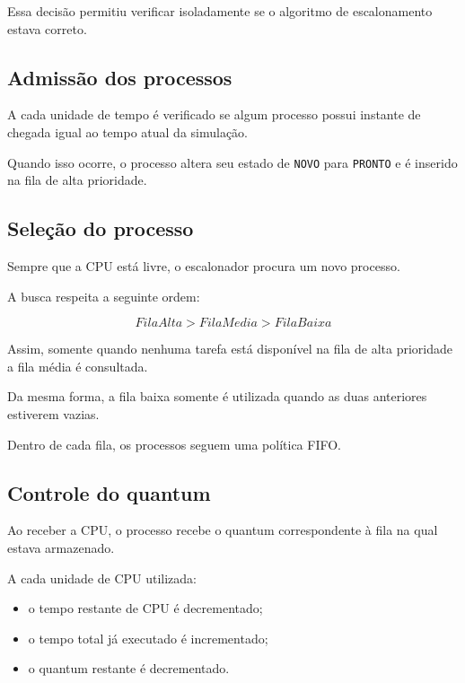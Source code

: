 \documentclass[12pt,a4paper]{article}
\begin{document}
Essa decisão permitiu verificar isoladamente se o algoritmo de
escalonamento estava correto.



\subsection{Admissão dos processos}

A cada unidade de tempo é verificado se algum processo possui
instante de chegada igual ao tempo atual da simulação.

Quando isso ocorre, o processo altera seu estado de \texttt{NOVO}
para \texttt{PRONTO} e é inserido na fila de alta prioridade.


\subsection{Seleção do processo}

Sempre que a CPU está livre, o escalonador procura um novo processo.

A busca respeita a seguinte ordem:

\[
FilaAlta > FilaMedia > FilaBaixa
\]

Assim, somente quando nenhuma tarefa está disponível na fila de alta
prioridade a fila média é consultada.

Da mesma forma, a fila baixa somente é utilizada quando as duas
anteriores estiverem vazias.

Dentro de cada fila, os processos seguem uma política FIFO.



\subsection{Controle do quantum}

Ao receber a CPU, o processo recebe o quantum correspondente à fila
na qual estava armazenado.

A cada unidade de CPU utilizada:

\begin{itemize}

    \item o tempo restante de CPU é decrementado;

    \item o tempo total já executado é incrementado;

    \item o quantum restante é decrementado.

\end{itemize}
\end{document}
